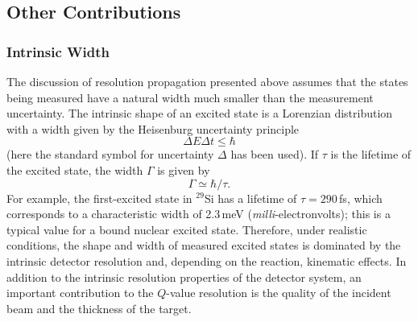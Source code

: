 \subsection{Other Contributions}
\label{other_contrib}
\subsubsection{Intrinsic Width}
The discussion of resolution propagation presented above assumes that the states being measured have a natural width much smaller than the measurement uncertainty.  The intrinsic shape of an excited state is a Lorenzian distribution with a width given by the Heisenburg uncertainty principle
\begin{equation}
\Delta E \Delta t \leq \hbar
\label{eq:heisenburg}
\end{equation}
(here the standard symbol for uncertainty $\Delta$ has been used)\cite{Satchler_1990}.  If $\tau$ is the lifetime of the excited state, the width $\Gamma$ is given by 
\begin{equation}
\Gamma \simeq \hbar/\tau.
\label{eq:width}
\end{equation}
For example, the first-excited state in $^{29}$Si has a lifetime of $\tau=290$\,fs, which corresponds to a characteristic width of 2.3\,meV (\textit{milli}-electronvolts); this is a typical value for a bound nuclear excited state.  Therefore, under realistic conditions, the shape and width of measured excited states is dominated by the intrinsic detector resolution and, depending on the reaction, kinematic effects.  
In addition to the intrinsic resolution properties of the detector system, an important contribution to the $Q$-value resolution is the quality of the incident beam and the thickness of the target.

